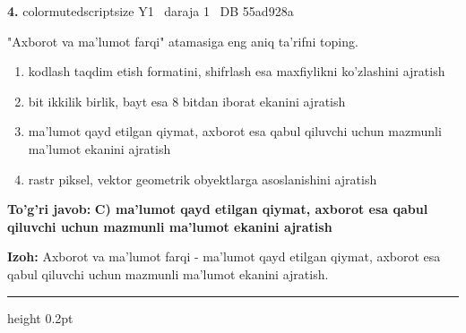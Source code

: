 \documentclass[10pt,a4paper,oneside]{article}
\begin{document}
\noindent\textbf{\color{ink}4.}  {color{muted}scriptsize Y1 \textbullet\ daraja 1 \textbullet\ DB 55ad928a}
\par
"Axborot va ma'lumot farqi" atamasiga eng aniq ta'rifni toping.
\begin{enumerate}[label=\Alph*),leftmargin=9mm]
\item kodlash taqdim etish formatini, shifrlash esa maxfiylikni ko'zlashini ajratish
\item bit ikkilik birlik, bayt esa 8 bitdan iborat ekanini ajratish
\item ma'lumot qayd etilgan qiymat, axborot esa qabul qiluvchi uchun mazmunli ma'lumot ekanini ajratish
\item rastr piksel, vektor geometrik obyektlarga asoslanishini ajratish
\end{enumerate}
\begin{tcolorbox}[enhanced,breakable,colback=teal!4,colframe=teal!50!black,boxrule=0.5pt,arc=1.1mm,left=3mm,right=3mm,top=1.7mm,bottom=1.7mm,before skip=2mm,after skip=2mm]
\textbf{\color{teal}To'g'ri javob:} \textbf{C) ma'lumot qayd etilgan qiymat, axborot esa qabul qiluvchi uchun mazmunli ma'lumot ekanini ajratish}
\par\smallskip
\textbf{Izoh:} Axborot va ma'lumot farqi - ma'lumot qayd etilgan qiymat, axborot esa qabul qiluvchi uchun mazmunli ma'lumot ekanini ajratish.
\end{tcolorbox}
\vspace{2mm}\hrule height 0.2pt \vspace{3mm}
\end{document}
